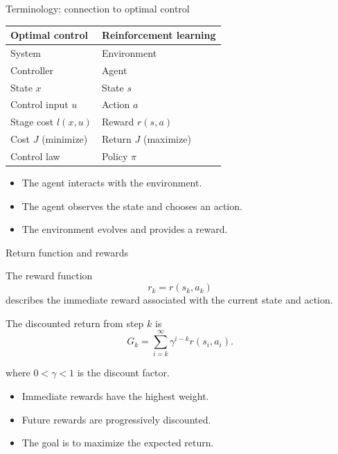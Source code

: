 \documentclass{beamer}
\begin{document}
\begin{frame}{Terminology: connection to optimal control}
	
	\centering
	\begin{tabular}{ll}
		\textbf{Optimal control} & \textbf{Reinforcement learning} \\
		\hline
		System & Environment \\
		Controller & Agent \\
		State $x$ & State $s$ \\
		Control input $u$ & Action $a$ \\
		Stage cost $l(x,u)$ & Reward $r(s,a)$ \\
		Cost $J$ (minimize) & Return $J$ (maximize) \\
		Control law & Policy $\pi$
	\end{tabular}
	
	\vspace{0.4cm}
	
	\begin{itemize}
		\item The agent interacts with the environment.
		\item The agent observes the state and chooses an action.
		\item The environment evolves and provides a reward.
	\end{itemize}
	
\end{frame}


\begin{frame}{Return function and rewards}
	\begin{flushleft}
	The reward function
	\[
	r_k = r(s_k,a_k)
	\]
	describes the immediate reward associated with the current
	state and action.
	
	\vspace{0.3cm}
	
	The discounted return from step $k$ is
	\[
	G_k =
	\sum_{i=k}^{\infty}
	\gamma^{i-k}r(s_i,a_i).
	\]
	
	where $0<\gamma<1$ is the discount factor.
	
	\vspace{0.3cm}
	
	\begin{itemize}
		\item Immediate rewards have the highest weight.
		\item Future rewards are progressively discounted.
		\item The goal is to maximize the expected return.
	\end{itemize}
	
	\end{flushleft}
\end{frame}
\end{document}
